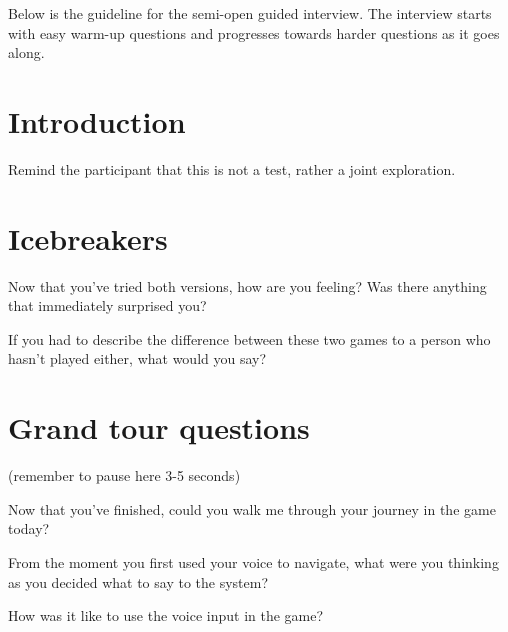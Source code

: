 

Below is the guideline for the semi-open guided interview. 
The interview starts with easy warm-up questions and progresses towards harder questions as it goes along.

\section{Introduction}
Remind the participant that this is not a test, rather a joint exploration.

\section{Icebreakers}

\begin{QandA}
   \item Now that you’ve tried both versions, how are you feeling? Was there anything that immediately surprised you?
         \begin{answered}
         
         \end{answered}

   \item If you had to describe the difference between these two games to a person who hasn't played either, what would you say?
         \begin{answered}
         
         \end{answered}
\end{QandA}




\section{Grand tour questions}
(remember to pause here 3-5 seconds)

\begin{QandA}
   \item Now that you've finished, could you walk me through your journey in the game today?
         \begin{answered}
         
         \end{answered}
    

   \item From the moment you first used your voice to navigate, what were you thinking as you decided what to say to the system?

         \begin{answered}
         
         \end{answered}

    \item How was it like to use the voice input in the game?
         \begin{answered}
         
         \end{answered}


\end{QandA}




